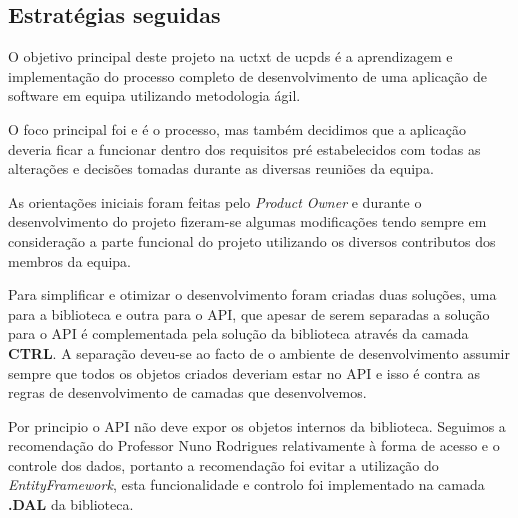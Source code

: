 
\subsection{Estratégias seguidas}

O objetivo principal deste projeto na \acrshort{uctxt} de \acrlong{ucpds} é a aprendizagem e implementação do processo completo de desenvolvimento de uma aplicação de software em equipa utilizando metodologia ágil.

O foco principal foi e é o processo, mas também decidimos que a aplicação deveria ficar a funcionar dentro dos requisitos pré estabelecidos com todas as alterações e decisões tomadas durante as diversas reuniões da equipa.

As orientações iniciais foram feitas pelo \textit{Product Owner} e durante o desenvolvimento do projeto fizeram-se algumas modificações tendo sempre em consideração a parte funcional do projeto utilizando os diversos contributos dos membros da equipa. 

Para simplificar e otimizar o desenvolvimento foram criadas duas soluções, uma para a biblioteca e outra para o API,  que apesar de serem separadas a solução para o API é complementada pela solução da biblioteca através da camada \textbf{CTRL}.
A separação deveu-se ao facto de o ambiente de desenvolvimento assumir sempre que todos os objetos criados deveriam estar no API e isso é contra as regras de desenvolvimento de camadas que desenvolvemos. 

Por principio o API não deve expor os objetos internos da biblioteca. Seguimos a recomendação do Professor Nuno Rodrigues relativamente à forma de acesso e o controle dos dados, portanto a recomendação foi evitar a utilização do \textit{EntityFramework}, esta funcionalidade e controlo foi implementado na camada \textbf{.DAL} da biblioteca. 

